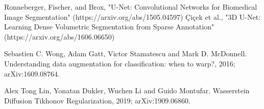 \documentclass[]{article}
\begin{document}
\begin{thebibliography}{9}
	Ronneberger, Fischer, and Brox, "U-Net: Convolutional Networks for Biomedical Image Segmentation" (https://arxiv.org/abs/1505.04597)
	Çiçek et al., "3D U-Net: Learning Dense Volumetric Segmentation from Sparse Annotation" (https://arxiv.org/abs/1606.06650)
	
	Sebastien C. Wong, Adam Gatt, Victor Stamatescu and Mark D. McDonnell.
	\newblock Understanding data augmentation for classification: when to warp?, 2016;
	\newblock arXiv:1609.08764.
	
	Alex Tong Lin, Yonatan Dukler, Wuchen Li and Guido Montufar.
	\newblock Wasserstein Diffusion Tikhonov Regularization, 2019;
	\newblock arXiv:1909.06860.
\end{thebibliography}
\end{document}
